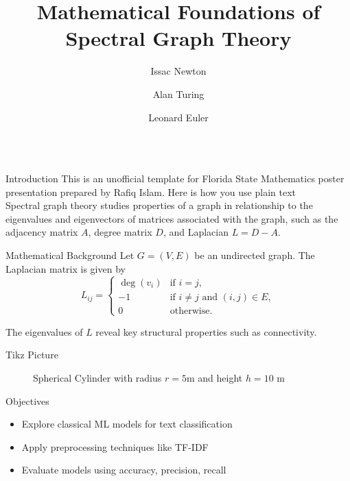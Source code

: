 \documentclass{beamer}
\title{Mathematical Foundations of Spectral Graph Theory}
\author{Issac Newton \inst{1} \and Alan Turing \inst{1} \and Leonard Euler \inst{2}}
\institute[shortinst]{\inst{1} University of Cambridge \qquad \inst{2} University of Basel}
\newlength{\colwidth}
\begin{document}
\begin{frame}[t]
\begin{columns}[t]

\begin{column}{\colwidth}
\begin{block}{Introduction}
This is an unofficial template for Florida State Mathematics poster presentation prepared by Rafiq Islam\cite{fsumathposter25}. Here is how you use plain text\hfill\\
Spectral graph theory studies properties of a graph in relationship to the eigenvalues and eigenvectors of matrices associated with the graph, such as the adjacency matrix $A$, degree matrix $D$, and Laplacian $L = D - A$.
\end{block}

\begin{block}{Mathematical Background}
    Let $G = (V, E)$ be an undirected graph. The Laplacian matrix is given by
        \[
        L_{ij} =
        \begin{cases}
        \deg(v_i) & \text{if } i = j, \\
        -1 & \text{if } i \neq j \text{ and } (i,j) \in E, \\
        0 & \text{otherwise}.
        \end{cases}
        \]

        The eigenvalues of $L$ reveal key structural properties such as connectivity.
\end{block}

\begin{block}{Tikz Picture}
    \begin{figure}
        \centering
        \caption{Spherical Cylinder with radius $r=5$m and height $h=10$ m}
        \label{fig:fig1}
    \end{figure}
\end{block}

\begin{block}{Objectives}
\begin{itemize}
  \item Explore classical ML models for text classification
  \item Apply preprocessing techniques like TF-IDF
  \item Evaluate models using accuracy, precision, recall
\end{itemize}
\end{block}


\end{column}
\end{columns}
\end{frame}
\end{document}
